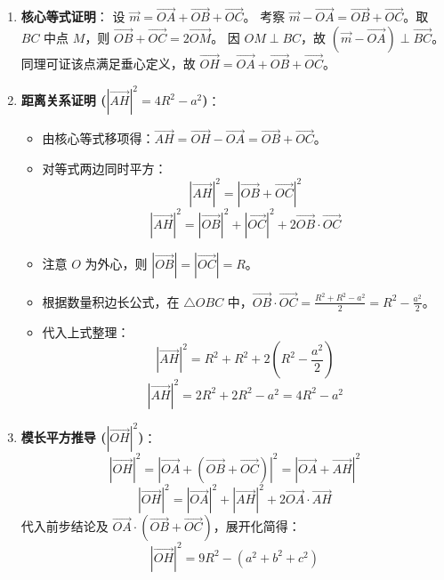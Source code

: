 \begin{proofbox}
\begin{enumerate}
    \item \textbf{核心等式证明}：
    设 $\vec{m} = \vec{OA} + \vec{OB} + \vec{OC}$。
    考察 $\vec{m} - \vec{OA} = \vec{OB} + \vec{OC}$。取 $BC$ 中点 $M$，则 $\vec{OB} + \vec{OC} = 2\vec{OM}$。
    因 $OM \perp BC$，故 $(\vec{m} - \vec{OA}) \perp \vec{BC}$。同理可证该点满足垂心定义，故 $\vec{OH} = \vec{OA} + \vec{OB} + \vec{OC}$。

    \item \textbf{距离关系证明 ($|\vec{AH}|^2 = 4R^2 - a^2$)}：
    \begin{itemize}
        \item 由核心等式移项得：$\vec{AH} = \vec{OH} - \vec{OA} = \vec{OB} + \vec{OC}$。
        \item 对等式两边同时平方：
        \[ |\vec{AH}|^2 = |\vec{OB} + \vec{OC}|^2 \]
        \[ |\vec{AH}|^2 = |\vec{OB}|^2 + |\vec{OC}|^2 + 2\vec{OB} \cdot \vec{OC} \]
        \item 注意 $O$ 为外心，则 $|\vec{OB}| = |\vec{OC}| = R$。
        \item 根据数量积边长公式，在 $\triangle OBC$ 中，$\vec{OB} \cdot \vec{OC} = \frac{R^2 + R^2 - a^2}{2} = R^2 - \frac{a^2}{2}$。
        \item 代入上式整理：
        \[ |\vec{AH}|^2 = R^2 + R^2 + 2(R^2 - \frac{a^2}{2}) \]
        \[ |\vec{AH}|^2 = 2R^2 + 2R^2 - a^2 = 4R^2 - a^2 \]
    \end{itemize}

    \item \textbf{模长平方推导 ($|\vec{OH}|^2$)}：
    \[ |\vec{OH}|^2 = |\vec{OA} + (\vec{OB} + \vec{OC})|^2 = |\vec{OA} + \vec{AH}|^2 \]
    \[ |\vec{OH}|^2 = |\vec{OA}|^2 + |\vec{AH}|^2 + 2\vec{OA} \cdot \vec{AH} \]
    代入前步结论及 $\vec{OA} \cdot (\vec{OB} + \vec{OC})$，展开化简得：
    \[ |\vec{OH}|^2 = 9R^2 - (a^2 + b^2 + c^2) \]
\end{enumerate}
\end{proofbox}